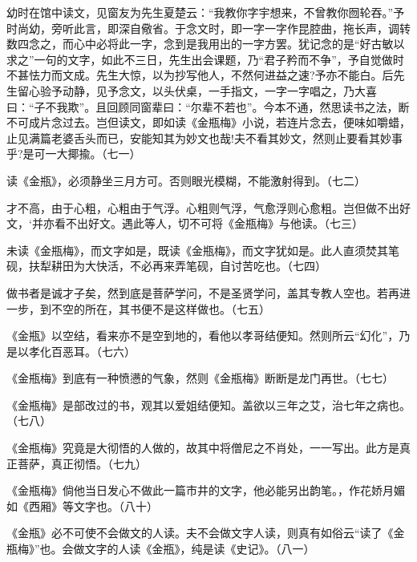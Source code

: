 {幼时在馆中读文，见窗友为先生夏楚云：“我教你字宇想来，不曾教你囫轮吞。”予时尚幼，旁听此言，即深自儆省。于念文时，即一字一字作昆腔曲，拖长声，调转数四念之，而心中必将此一字，念到是我用出的一字方罢。犹记念的是“好古敏以求之”一句的文字，如此不三日，先生出会课题，乃“君子矜而不争”，予自觉做时不甚怯力而文成。先生大惊，以为抄写他人，不然何进益之速?予亦不能白。后先生留心验予动静，见予念文，以头伏桌，一手指文，一字一字唱之，乃大喜曰：“子不我欺”。且回顾同窗辈曰：“尔辈不若也”。今本不通，然思读书之法，断不可成片念过去。岂但读文，即如读《金瓶梅》小说，若连片念去，便味如嚼蜡，止见满篇老婆舌头而已，安能知其为妙文也哉!夫不看其妙文，然则止要看其妙事乎?是可一大揶揄。（七一）

读《金瓶》，必须静坐三月方可。否则眼光模糊，不能激射得到。（七二）

才不高，由于心粗，心粗由于气浮。心粗则气浮，气愈浮则心愈粗。岂但做不出好文，‘并亦看不出好文。遇此等人，切不可将《金瓶梅》与他读。（七三）

未读《金瓶梅》，而文字如是，既读《金瓶梅》，而文字犹如是。此人直须焚其笔砚，扶犁耕田为大快活，不必再来弄笔砚，自讨苦吃也。（七四）

做书者是诚才子矣，然到底是菩萨学问，不是圣贤学问，盖其专教人空也。若再进一步，到不空的所在，其书便不是这样做也。（七五）

《金瓶》以空结，看来亦不是空到地的，看他以孝哥结便知。然则所云“幻化”，乃是以孝化百恶耳。（七六）

《金瓶梅》到底有一种愤懑的气象，然则《金瓶梅》断断是龙门再世。（七七）

《金瓶梅》是部改过的书，观其以爱姐结便知。盖欲以三年之艾，治七年之病也。（七八）

《金瓶梅》究竟是大彻悟的人做的，故其中将僧尼之不肖处，一一写出。此方是真正菩萨，真正彻悟。（七九）

《金瓶梅》倘他当日发心不做此一篇市井的文字，他必能另出韵笔。，作花娇月媚如《西厢》等文字也。（八十）

《金瓶》必不可使不会做文的人读。夫不会做文字人读，则真有如俗云“读了《金瓶梅》”也。会做文字的人读《金瓶》，纯是读《史记》。（八一）

}
